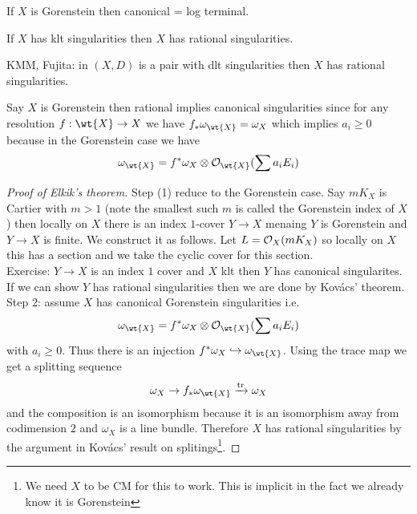 \documentclass[12pt]{article}
\begin{document}
\begin{rmk}
If $X$ is Gorenstein then canonical = log terminal.
\end{rmk}

\begin{theorem}[Elkik]
If $X$ has klt singularities then $X$ has rational singularities. 
\end{theorem}

\begin{rmk}
KMM, Fujita: in $(X, D)$ is a pair with dlt singularities then $X$ has rational singularities. 
\end{rmk}

\begin{rmk}
Say $X$ is Gorenstein then rational implies canonical singularities since for any resolution $f : \wt{X} \to X$ we have $f_* \omega_{\wt{X}} = \omega_X$ which implies $a_i \ge 0$ because in the Gorenstein case we have
\[ \omega_{\wt{X}} = f^* \omega_X \ot \struct{\wt{X}}(\sum a_i E_i) \]
\end{rmk}

\begin{proof}[Proof of Elkik's theorem]
Step (1) reduce to the Gorenstein case. Say $m K_X$ is Cartier with $m > 1$ (note the smallest such $m$ is called the Gorenstein index of $X$) then locally on $X$ there is an index $1$-cover $Y \to X$ menaing $Y$ is Gorenstein and $Y \to X$ is finite. We construct it as follows. Let $L = \mathcal{O}_{X}(mK_X)$ so locally on $X$ this has a section and we take the cyclic cover for this section.
\bigskip\\
Exercise: $Y \to X$ is an index $1$ cover and $X$ klt then $Y$ has canonical singularites. If we can show $Y$ has rational singularities then we are done by Kov\'{a}cs' theorem. 
\bigskip\\
Step 2: assume $X$ has canonical Gorenstein singularities i.e.
\[ \omega_{\wt{X}} = f^* \omega_X \ot \struct{\wt{X}}(\sum a_i E_i) \]
with $a_i \ge 0$. Thus there is an injection $f^* \omega_X \embed \omega_{\wt{X}}$. Using the trace map we get a splitting sequence
\[ \omega_X \to f_* \omega_{\wt{X}} \xrightarrow{\tr} \omega_X \]
and the composition is an isomorphism because it is an isomorphism away from codimension $2$ and $\omega_X$ is a line bundle. Therefore $X$ has rational singularities by the argument in Kov\'{a}cs' result on splitings\footnote{We need $X$ to be CM for this to work. This is implicit in the fact we already know it is Gorenstein}.
\end{proof}
\end{document}
